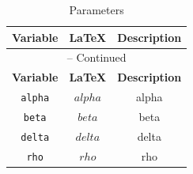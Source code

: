 \begin{center}
\begin{longtable}{ccc}
\caption{Parameters}\\%
\hline%
\multicolumn{1}{c}{\textbf{Variable}} &
\multicolumn{1}{c}{\textbf{\LaTeX}} &
\multicolumn{1}{c}{\textbf{Description}}\\%
\hline\hline%
\endfirsthead
\multicolumn{3}{c}{{\tablename} \thetable{} -- Continued}\\%
\hline%
\multicolumn{1}{c}{\textbf{Variable}} &
\multicolumn{1}{c}{\textbf{\LaTeX}} &
\multicolumn{1}{c}{\textbf{Description}}\\%
\hline\hline%
\endhead
\texttt{alpha} & $alpha$ & alpha\\
\texttt{beta} & $beta$ & beta\\
\texttt{delta} & $delta$ & delta\\
\texttt{rho} & $rho$ & rho\\
\hline%
\end{longtable}
\end{center}
